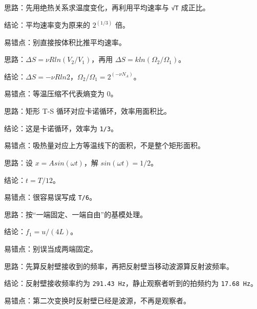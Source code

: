 \documentclass[12pt,a4paper]{ctexart}
\begin{document}
\begin{tcolorbox}[colback=white,colframe=black!55,title={一-2. 单原子理想气体绝热压缩到原体积一半，求平均速率变化倍数}]
思路：先用绝热关系求温度变化，再利用平均速率与 \texttt{√T} 成正比。\par
结论：平均速率变为原来的 \(2^(1/3)\) 倍。\par
易错点：别直接按体积比推平均速率。\par
\end{tcolorbox}

\begin{tcolorbox}[colback=white,colframe=black!55,title={一-3. \texttt{ν mol} 理想气体等温压缩到原体积一半，求熵变和微观状态数之比}]
思路：\(ΔS=νR ln(V_2/V_1)\)，再用 \(ΔS=k ln(Ω_2/Ω_1)\)。\par
结论：\(ΔS=-νR ln2\)，\(Ω_2/Ω_1=2^(-νN_A)\)。\par
易错点：等温压缩不代表熵变为 0。\par
\end{tcolorbox}

\begin{tcolorbox}[colback=white,colframe=black!55,title={一-4. 温熵图中矩形循环的名称与效率}]
思路：矩形 T-S 循环对应卡诺循环，效率用面积比。\par
结论：这是卡诺循环，效率为 \texttt{1/3}。\par
易错点：吸热量对应上方等温线下的面积，不是整个矩形面积。\par
\end{tcolorbox}

\begin{tcolorbox}[colback=white,colframe=black!55,title={一-5. 弹簧振子从平衡位置向 \texttt{+x} 方向出发，求首次到达 \texttt{A/2} 的时刻}]
思路：设 \(x=A sin(ωt)\)，解 \(sin(ωt)=1/2\)。\par
结论：\(t=T/12\)。\par
易错点：很容易误写成 \texttt{T/6}。\par
\end{tcolorbox}

\begin{tcolorbox}[colback=white,colframe=black!55,title={一-6. 长为 \texttt{L} 的杆中波速为 \texttt{u}，一端固定，求基频}]
思路：按“一端固定、一端自由”的基模处理。\par
结论：\(f_1=u/(4L)\)。\par
易错点：别误当成两端固定。\par
\end{tcolorbox}

\begin{tcolorbox}[colback=white,colframe=black!55,title={一-7. 运动波源与运动反射壁的多普勒效应}]
思路：先算反射壁接收到的频率，再把反射壁当移动波源算反射波频率。\par
结论：反射壁接收频率约为 \texttt{291.43 Hz}，静止观察者听到的拍频约为 \texttt{17.68 Hz}。\par
易错点：第二次变换时反射壁已经是波源，不再是观察者。\par
\end{tcolorbox}
\end{document}
